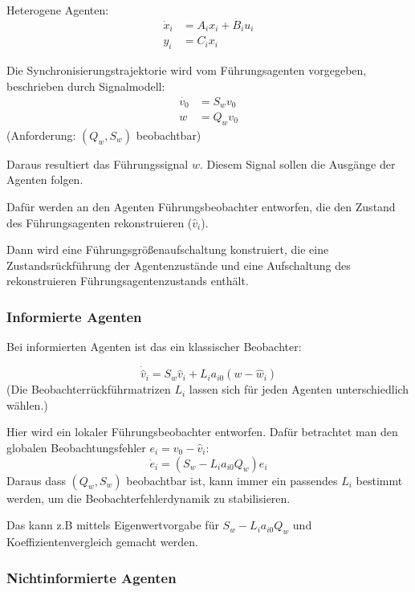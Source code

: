 Heterogene Agenten:
\begin{align}
    \dot{x}_i &= A_i x_i + B_i u_i \\
    y_i &= C_i x_i
\end{align}

Die Synchronisierungstrajektorie wird vom Führungsagenten vorgegeben, beschrieben
durch Signalmodell:
\begin{align}
    \dot{v_0} &= S_w v_0 \\
    w &= Q_w v_0
\end{align}
(Anforderung: $(Q_w, S_w)$ beobachtbar)

Daraus resultiert das Führungssignal $w$.
Diesem Signal sollen die Ausgänge der Agenten folgen.

Dafür werden an den Agenten Führungsbeobachter entworfen, die den Zustand des
Führungsagenten rekonstruieren ($\hat{v}_i$).

Dann wird eine Führungsgrößenaufschaltung konstruiert, die eine Zustandsrückführung
der Agentenzustände und eine Aufschaltung des rekonstruieren
Führungsagentenzustands enthält.


\subsubsection{Informierte Agenten}

Bei informierten Agenten ist das ein klassischer Beobachter:

\begin{equation}
    \dot{\hat{v}}_i = S_w \hat{v}_i + L_i a_{i0} (w-\hat{w}_i)
\end{equation}
(Die Beobachterrückführmatrizen $L_i$ lassen sich für jeden Agenten
unterschiedlich wählen.)


Hier wird ein lokaler Führungsbeobachter entworfen.
Dafür betrachtet man den globalen Beobachtungsfehler $e_i = v_0 - \hat{v}_i$:
\begin{equation}
    \dot{e}_i = (S_w - L_i a_{i0} Q_w) e_i
\end{equation}
Daraus dass $(Q_w, S_w)$ beobachtbar ist, kann immer ein passendes $L_i$ bestimmt werden,
um die Beobachterfehlerdynamik zu stabilisieren.

Das kann z.B mittels Eigenwertvorgabe für $S_w - L_i a_{i0} Q_w$ und
Koeffizientenvergleich gemacht werden.

\subsubsection{Nichtinformierte Agenten}

